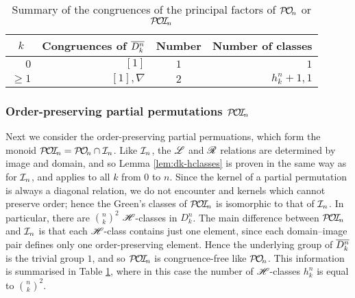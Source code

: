 \begin{table}[h]
  \centering
  \renewcommand{\arraystretch}{1.3}
  \begin{tabular}{| r | r | c | r |}
    \hline
    \multicolumn{1}{|c|}{$k$}
    & \multicolumn{1}{c|}{\textbf{Congruences of $\overline{D_k^n}$}}
    & \textbf{Number}
    & \multicolumn{1}{c|}{\textbf{Number of classes}} \\
    \hline
    $0$ & $[1]$ & $1$ & $1$ \\
    $\geq 1$
    & $[1], \nabla$
    & $2$
    & $h_k^n + 1, 1$ \\
    \hline
  \end{tabular}
  \caption{Summary of the congruences of the principal factors of $\mathcal{P\!O\!}_n$ or
    $\mathcal{P\!O\!I\!}_n$}
  \label{tab:dkstar-congs-pon}
\end{table}

\subsubsection{Order-preserving partial permutations $\mathcal{P\!O\!I\!}_n$}
\label{sec:princfact-poin}
Next we consider the order-preserving partial permuations, which form the monoid
$\mathcal{P\!O\!I\!}_n = \mathcal{P\!O\!}_n \cap \mathcal{I}_n$.  Like $\mathcal{I}_n$, the $\mathrel{\mathscr{L}}$ and $\mathrel{\mathscr{R}}$ relations are
determined by image and domain, and so Lemma \ref{lem:dk-hclasses} is proven in
the same way as for $\mathcal{I}_n$, and applies to all $k$ from $0$ to $n$.  Since the
kernel of a partial permutation is always a diagonal relation, we do not
encounter and kernels which cannot preserve order; hence the Green's classes of
$\mathcal{P\!O\!I\!}_n$ is isomorphic to that of $\mathcal{I}_n$.  In particular, there are
$\binom{n}{k}^2$ $\mathrel{\mathscr{H}}$-classes in $D_k^n$.  The main difference between $\mathcal{P\!O\!I\!}_n$
and $\mathcal{I}_n$ is that each $\mathrel{\mathscr{H}}$-class contains just one element, since each
domain--image pair defines only one order-preserving element.  Hence the
underlying group of $\overline{D_k^n}$ is the trivial group $1$, and so $\mathcal{P\!O\!I\!}_n$ is
congruence-free like $\mathcal{P\!O\!}_n$.  This information is summarised in Table
\ref{tab:dkstar-congs-pon}, where in this case the number of $\mathrel{\mathscr{H}}$-classes
$h_k^n$ is equal to $\binom{n}{k}^2$.

